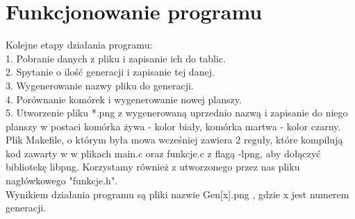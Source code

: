 \documentclass[11pt]{article}
\begin{document}
\section{Funkcjonowanie programu}

Kolejne etapy działania programu:
\\
1.	Pobranie danych z pliku i zapisanie ich do tablic.
\\
2.	Spytanie o ilość generacji i zapisanie tej danej.
\\
3.	Wygenerowanie nazwy pliku do generacji.
\\
4.	Porównanie komórek i wygenerowanie nowej planszy.
\\
5.  Utworzenie pliku *.png z wygenerowaną uprzednio nazwą i zapisanie do niego planszy w postaci komórka żywa - kolor biały, komórka martwa - kolor czarny.
\\
Plik Makefile, o którym była mowa wcześniej zawiera 2 reguły, które kompilują kod zawarty w w plikach main.c oraz funkcje.c z flagą -lpng, aby dołączyć bibliotekę libpng. Korzystamy również z utworzonego przez nas pliku nagłówkowego "funkcje.h".
\\
Wynikiem działania programu są pliki nazwie Gen[x].png , gdzie x jest numerem generacji.
\end{document}
